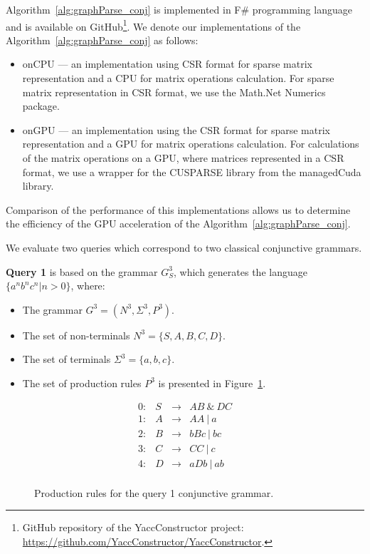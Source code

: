 Algorithm~\ref{alg:graphParse_conj} is implemented in F\# programming language~\cite{fsharp} and is available on GitHub\footnote{GitHub repository of the YaccConstructor project: \url{https://github.com/YaccConstructor/YaccConstructor}.}. We denote our implementations of the Algorithm~\ref{alg:graphParse_conj} as follows:
\begin{itemize}
	\item onCPU --- an implementation using CSR format for sparse matrix representation and a CPU for matrix operations calculation. For sparse matrix representation in CSR format, we use the Math.Net Numerics package.
	\item onGPU --- an implementation using the CSR format for sparse matrix representation and a GPU for matrix operations calculation. For calculations of the matrix operations on a GPU, where matrices represented in a CSR format, we use a wrapper for the CUSPARSE library from the managedCuda library.
\end{itemize}

Comparison of the performance of this implementations allows us to determine the efficiency of the GPU acceleration of the Algorithm~\ref{alg:graphParse_conj}.

We evaluate two queries which correspond to two classical conjunctive grammars.

\textbf{Query 1} is based on the grammar $G^3_S$, which generates the language $\{a^n b^n c^n | n > 0\}$, where:
\begin{itemize}
	\item The grammar $G^3 = (N^3, \Sigma^3, P^3)$.
	\item The set of non-terminals $N^3 = \{S, A, B, C, D\}$.
	\item The set of terminals $\Sigma^3 = \{a, b, c\}.$
	\item The set of production rules $P^3$ is presented in Figure~\ref{ProductionRulesQuery3}.
\end{itemize}

\begin{figure}[h]
	\[
	\begin{array}{rccl}
	0: & S & \rightarrow & AB ~\& ~DC \\ 
	1: & A & \rightarrow & AA ~|~ a \\ 
	2: & B & \rightarrow & bBc ~|~ bc \\ 
	3: & C & \rightarrow & CC ~|~ c \\ 
	4: & D & \rightarrow & aDb ~|~ ab \\ 
	\end{array}
	\]
	\caption{Production rules for the query 1 conjunctive grammar.}
	\label{ProductionRulesQuery3}
\end{figure}

